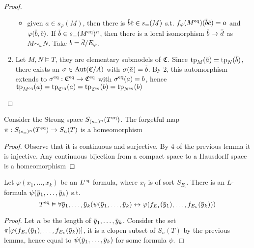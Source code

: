\documentclass[11pt]{article}
\begin{document}
\begin{proof}
\begin{enumerate}
{\begin{itemize}
\item given \(a\in s_\varphi(M)\), then there is \(\barb\barc\in s_=(M)\)
s.t. \(f_\varphi(M^{\eq})(\barb\barc)=a\) and \(\varphi(\barb,\barc)\). If \(\barb\in s_=(M^{\eq})^n\),
then there is a local isomorphism \(\barb\mapsto\bard\) as \(M\sim_\omega N\). Take \(b=\bard/E_\varphi\).
\end{itemize}
}
\item Let \(M,N\vDash T\), they are elementary submodels of \(\mathfrak{C}\). Since \(\tp_M(\bara)=\tp_N(\barb)\), there
exists an \(\sigma\in\operatorname{\text{Aut}}(\mathfrak{C}/A)\) with \(\sigma(\bara)=\barb\). By 2, this automorphism extends to \(\sigma^{\operatorname{eq}}:\mathfrak{C}^{\operatorname{eq}}\to\mathfrak{C}^{\operatorname{eq}}\)
with \(\sigma^{\operatorname{eq}}(a)=b\), hence \(\operatorname{tp}_{M^{\operatorname{eq}}}(a)=\operatorname{tp}_{\mathfrak{C}^{\operatorname{eq}}}(a)=\operatorname{tp}_{\mathfrak{C}^{\operatorname{eq}}}(b)=\operatorname{tp}_{N^{\operatorname{eq}}}(b)\)
\end{enumerate}
\end{proof}

\begin{corollary}[]
Consider the Strong space \(S_{(s_=)^n}(T^{\operatorname{eq}})\). The forgetful
map \(\pi:S_{(s_=)^n}(T^{\operatorname{eq}})\to S_n(T)\) is a homeomorphism
\end{corollary}

\begin{proof}
Observe that it is continuous and surjective. By 4 of the previous lemma it is injective. Any
continuous bijection from a compact space to a Hausdorff space is a homeomorphism
\end{proof}

\begin{proposition}[]
\label{P2.28}
Let \(\varphi(x_1,\dots,x_k)\) be an \(L^{\operatorname{eq}}\) formula, where \(x_i\) is of sort \(S_{E_i}\). There is
an \(L\)-formula \(\psi(\bary_1,\dots,\bary_k)\) s.t.
\begin{equation*}
T^{\eq}\vDash\forall \bary_1,\dots,\bary_k(\psi(\bary_1,\dots,\bary_k)\leftrightarrow\varphi(f_{E_1}(\bary_1),\dots,f_{E_k}(\bary_k)))
\end{equation*}
\end{proposition}

\begin{proof}
Let \(n\) be the length of \(\bary_1,\dots,\bary_k\). Consider the
set \(\pi[\varphi(f_{E_1}(\bary_1),\dots,f_{E_k}(\bary_k))]\), it is a clopen subset of \(S_n(T)\) by the
previous lemma, hence equal to \(\psi(\bary_1,\dots,\bary_k)\) for some formula \(\psi\).

\end{proof}
\end{document}
